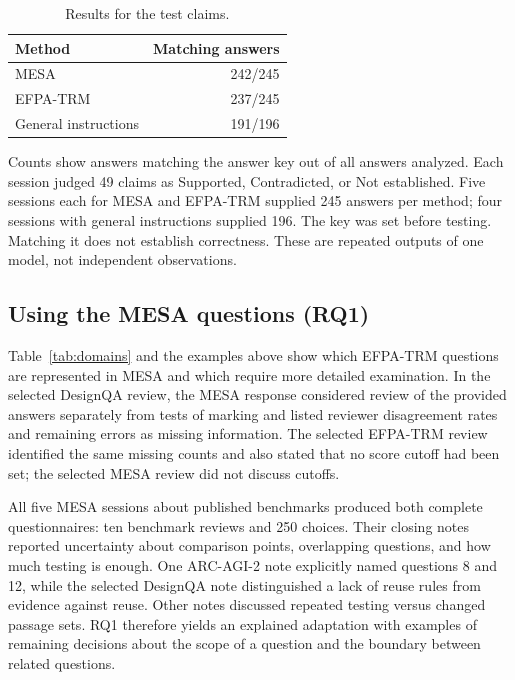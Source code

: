 \documentclass[10pt,conference]{IEEEtran}
\begin{document}
\begin{table}[t]
\caption{Results for the test claims.}
\label{tab:sessions}
\centering
\small
\begin{tabular}{@{}lr@{}}
\toprule
Method & Matching answers \\
\midrule
MESA & 242/245 \\
EFPA-TRM & 237/245 \\
General instructions & 191/196 \\
\bottomrule
\end{tabular}
\par\smallskip
\begin{minipage}{\columnwidth}
\footnotesize
Counts show answers matching the answer key out of all answers analyzed. Each session judged 49 claims as Supported, Contradicted, or Not established. Five sessions each for MESA and EFPA-TRM supplied 245 answers per method; four sessions with general instructions supplied 196. The key was set before testing. Matching it does not establish correctness. These are repeated outputs of one model, not independent observations.
\end{minipage}
\end{table}

\subsection{Using the MESA questions (RQ1)}
Table~\ref{tab:domains} and the examples above show which EFPA-TRM questions are represented in MESA and which require more detailed examination. In the selected DesignQA review, the MESA response considered review of the provided answers separately from tests of marking and listed reviewer disagreement rates and remaining errors as missing information. The selected EFPA-TRM review identified the same missing counts and also stated that no score cutoff had been set; the selected MESA review did not discuss cutoffs.

All five MESA sessions about published benchmarks produced both complete questionnaires: ten benchmark reviews and 250 choices. Their closing notes reported uncertainty about comparison points, overlapping questions, and how much testing is enough. One ARC-AGI-2 note explicitly named questions 8 and 12, while the selected DesignQA note distinguished a lack of reuse rules from evidence against reuse. Other notes discussed repeated testing versus changed passage sets. RQ1 therefore yields an explained adaptation with examples of remaining decisions about the scope of a question and the boundary between related questions.
\end{document}
